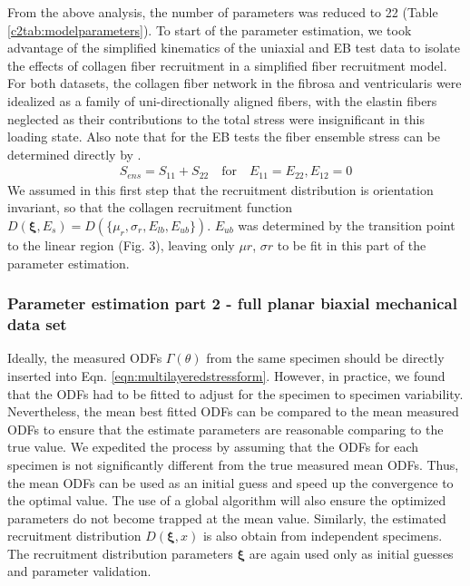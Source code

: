     From the above analysis, the number of parameters was reduced to 22 (Table \ref{c2tab:modelparameters}). To start of the parameter estimation, we took advantage of the simplified kinematics of the uniaxial and EB test data to isolate the effects of collagen fiber recruitment in a simplified fiber recruitment model. For both datasets, the collagen fiber network in the fibrosa and ventricularis were idealized as a family of uni-directionally aligned fibers, with the elastin fibers neglected as their contributions to the total stress were insignificant in this loading state. Also note that for the EB tests the fiber ensemble stress can be determined directly by \cite{sacks_biaxial_2000}.
        \begin{equation}\label{c2eqn:ensembleform}
        \begin{aligned}
        S_{ens} = S_{11} + S_{22} \quad \text{for} \quad E_{11} = E_{22}, E_{12} = 0
        \end{aligned}
        \end{equation}
    We assumed in this first step that the recruitment distribution is orientation invariant, so that the collagen recruitment function $D(\mathbf{\xi},E_s) = D(\{\mu_r, \sigma_r, E_{lb}, E_{ub}\})$. $E_{ub}$ was determined by the transition point to the linear region (Fig. 3), leaving only $\mu r$, $\sigma r$ to be fit in this part of the parameter estimation. 
    
    
\subsubsection{Parameter estimation part 2 - full planar biaxial mechanical data set}

    Ideally, the measured ODFs $\Gamma(\theta)$ from the same specimen should be directly inserted into Eqn. \ref{eqn:multilayeredstressform}. However, in practice, we found that the ODFs had to be fitted to adjust for the specimen to specimen variability. Nevertheless, the mean best fitted ODFs can be compared to the mean measured ODFs to ensure that the estimate parameters are reasonable comparing to the true value. We expedited the process by assuming that the ODFs for each specimen is not significantly different from the true measured mean ODFs. Thus, the mean ODFs can be used as an initial guess and speed up the convergence to the optimal value. The use of a global algorithm will also ensure the optimized parameters do not become trapped at the mean value. Similarly, the estimated recruitment distribution $D(\mathbf{\xi}, x)$ is also obtain from independent specimens. The recruitment distribution parameters $\mathbf{\xi}$ are again used only as initial guesses and parameter validation.
    

